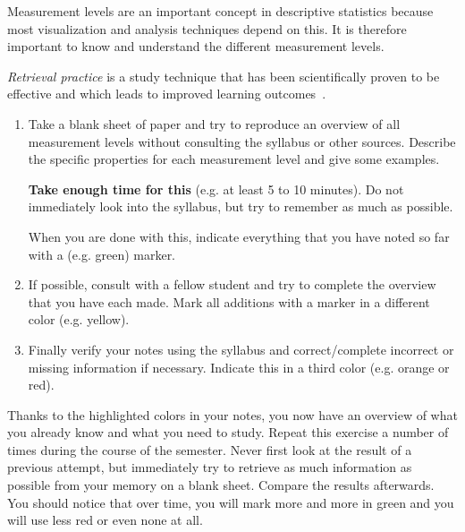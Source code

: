 \begin{exercise}
    \label{ex:retrieval-practice-measurement-levels}
    Measurement levels are an important concept in descriptive statistics because most visualization and analysis techniques depend on this. It is therefore important to know and understand the different measurement levels.
    
    \emph{Retrieval practice} is a study technique that has been scientifically proven to be effective and which leads to improved learning outcomes~\parencite{RoedigerKarpicke2006}.
    
    \begin{enumerate}[label=\alph*.]
        \item Take a blank sheet of paper and try to reproduce an overview of all measurement levels without consulting the syllabus or other sources. Describe the specific properties for each measurement level and give some examples.
        
        \textbf{Take enough time for this} (e.g. at least 5 to 10 minutes). Do not immediately look into the syllabus, but try to remember as much as possible.
        
        When you are done with this, indicate everything that you have noted so far with a (e.g. green) marker.
        
        \item If possible, consult with a fellow student and try to complete the overview that you have each made. Mark all additions with a marker in a different color (e.g. yellow).
        
        \item Finally verify your notes using the syllabus and correct/complete incorrect or missing information if necessary. Indicate this in a third color (e.g. orange or red).
    \end{enumerate}
    
    Thanks to the highlighted colors in your notes, you now have an overview of what you already know and what you need to study. 
    Repeat this exercise a number of times during the course of the semester. 
    Never first look at the result of a previous attempt, but immediately try to retrieve as much information as possible from your memory on a blank sheet. Compare the results afterwards. 
    You should notice that over time, you will mark more and more in green and you will use less red or even none at all.
\end{exercise}

